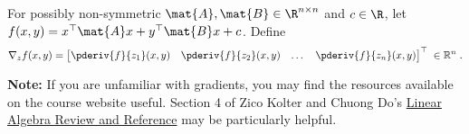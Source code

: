 \documentclass{article}
\begin{document}
\begin{aprob} \label{prob:sumvec}
    For possibly non-symmetric $\mat{A}, \mat{B} \in \R^{n \times n}$ and $c \in \R$, let $f(x, y) = x^\top \mat{A} x + y^\top \mat{B} x + c$. Define
    $$\nabla_z f(x,y) = \begin{bmatrix}
        \pderiv{f}{z_1}(x,y) & \pderiv{f}{z_2}(x,y) & \dots & \pderiv{f}{z_n}(x,y)
    \end{bmatrix}^\top \; \in{\mathbb R}^{n}\;.$$  

    \textbf{Note:} If you are unfamiliar with gradients, you may find the resources available on the course website useful. Section 4 of Zico Kolter and Chuong Do's \href{http://www.cs.cmu.edu/~zkolter/course/15-884/linalg-review.pdf}{Linear Algebra Review and Reference} may be particularly helpful.\\
    

\end{aprob}
\end{document}
